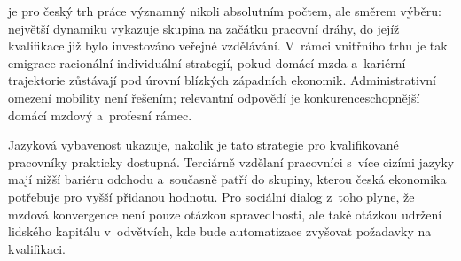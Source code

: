 je pro český trh práce významný nikoli absolutním počtem, ale směrem výběru: největší dynamiku vykazuje skupina na začátku pracovní dráhy, do jejíž kvalifikace již bylo investováno veřejné vzdělávání. V~rámci vnitřního trhu  je tak emigrace racionální individuální strategií, pokud domácí mzda a~kariérní trajektorie zůstávají pod úrovní blízkých západních ekonomik. Administrativní omezení mobility není řešením; relevantní odpovědí je konkurenceschopnější domácí mzdový a~profesní rámec.\par



Jazyková vybavenost ukazuje, nakolik je tato strategie pro kvalifikované pracovníky prakticky dostupná. Terciárně vzdělaní pracovníci s~více cizími jazyky mají nižší bariéru odchodu a~současně patří do skupiny, kterou česká ekonomika potřebuje pro vyšší přidanou hodnotu. Pro sociální dialog z~toho plyne, že mzdová konvergence není pouze otázkou spravedlnosti, ale také otázkou udržení lidského kapitálu v~odvětvích, kde bude automatizace zvyšovat požadavky na kvalifikaci.\par


